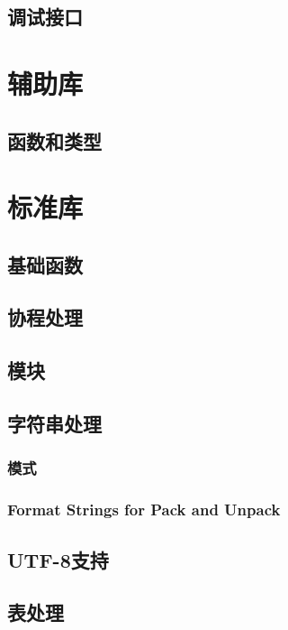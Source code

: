 \documentclass{ctexart}
\begin{document}
\subsection{调试接口}

\section{辅助库}

\subsection{函数和类型}

\section{标准库}

\subsection{基础函数}

\subsection{协程处理}

\subsection{模块}

\subsection{字符串处理}

\subsubsection{模式}

\subsubsection{Format Strings for Pack and Unpack}

\subsection{UTF-8支持}

\subsection{表处理}
\end{document}
